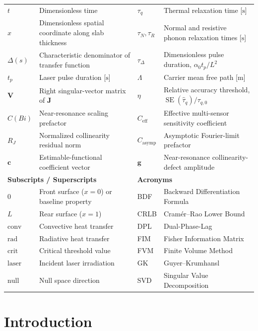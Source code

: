 \documentclass[preprint,12pt]{elsarticle}
\begin{document}
\begin{table}[h!]
{\begin{tabular}{llll}
$t$ & Dimensionless time & $\tau_q$ & Thermal relaxation time [$\mathrm{s}$] \\
$x$ & Dimensionless spatial coordinate along slab thickness & $\tau_N, \tau_R$ & Normal and resistive phonon relaxation times [$\mathrm{s}$] \\
$\Delta(s)$ & Characteristic denominator of transfer function & $\tau_\Delta$ & Dimensionless pulse duration, $\alpha_0 t_p / L^2$ \\
$t_p$ & Laser pulse duration [$\mathrm{s}$] & $\Lambda$ & Carrier mean free path [$\mathrm{m}$] \\
$\bm{V}$ & Right singular-vector matrix of $\bm{J}$ & $\eta$ & Relative accuracy threshold, $\operatorname{SE}(\hat{\tau}_q)/\tau_{q,0}$ \\
$C(Bi)$ & Near-resonance scaling prefactor & $C_{\mathrm{eff}}$ & Effective multi-sensor sensitivity coefficient \\
$R_J$ & Normalized collinearity residual norm & $C_{\mathrm{asymp}}$ & Asymptotic Fourier-limit prefactor \\
$\bm{c}$ & Estimable-functional coefficient vector & $\bm{g}$ & Near-resonance collinearity-defect amplitude \\
\multicolumn{2}{l}{\textbf{Subscripts / Superscripts}} & \multicolumn{2}{l}{\textbf{Acronyms}} \\
$0$ & Front surface ($x = 0$) or baseline property & BDF & Backward Differentiation Formula \\
$L$ & Rear surface ($x = 1$) & CRLB & Cramér--Rao Lower Bound \\
$\mathrm{conv}$ & Convective heat transfer & DPL & Dual-Phase-Lag \\
$\mathrm{rad}$ & Radiative heat transfer & FIM & Fisher Information Matrix \\
$\mathrm{crit}$ & Critical threshold value & FVM & Finite Volume Method \\
$\mathrm{laser}$ & Incident laser irradiation & GK & Guyer--Krumhansl \\
$\mathrm{null}$ & Null space direction & SVD & Singular Value Decomposition \\
\end{tabular}
}
\end{table}


\section{Introduction}
\end{document}
